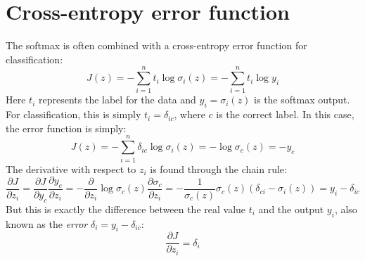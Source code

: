 \documentclass[12pt, a4paper]{article}
\numberwithin{equation}{section}
\begin{document}
\section{Cross-entropy error function}
The softmax is often combined with a cross-entropy error function for classification:
\begin{equation}
J(z)=-\sum_{i=1}^n t_i\log\sigma_i(z)=-\sum_{i=1}^n t_i\log y_i
\end{equation}
Here $t_i$ represents the label for the data and $y_i=\sigma_i(z)$ is the softmax output. For classification, this is simply $t_i=\delta_{ic}$, where $c$ is the correct label. In this case, the error function is simply:
\begin{equation}
J(z)=-\sum_{i=1}^n\delta_{ic}\log\sigma_i(z)=-\log\sigma_c(z)=-y_c
\end{equation}
The derivative with respect to $z_i$ is found through the chain rule:
\begin{equation}
\frac{\partial J}{\partial z_i}=\frac{\partial J}{\partial y_c}\frac{\partial y_c}{\partial z_i}=-\frac{\partial}{\partial z_i}\log\sigma_c(z)\frac{\partial\sigma_c}{\partial z_i}=-\frac{1}{\sigma_c(z)}\sigma_c(z)\left(\delta_{ci}-\sigma_i(z)\right)=y_i-\delta_{ic}
\end{equation}
But this is exactly the difference between the real value $t_i$ and the output $y_i$, also known as the \textit{error} $\delta_i=y_i-\delta_{ic}$:
\begin{equation}
\frac{\partial J}{\partial z_i}=\delta_i
\end{equation}
\end{document}
